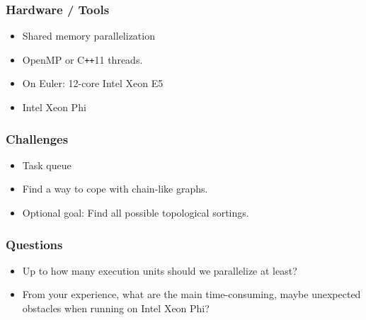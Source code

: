 \begin{frame}
\frametitle{Hardware / Tools}
\begin{itemize}
        \item Shared memory parallelization
        \item OpenMP or C\texttt{++}11 threads.
        \item On Euler: 12-core Intel Xeon E5
        \item Intel Xeon Phi
\end{itemize}
\end{frame}

\begin{frame}
\frametitle{Challenges}
\begin{itemize}
	\item Task queue
	\item Find a way to cope with chain-like graphs.
	\item Optional goal: Find all possible topological sortings.
\end{itemize}
\end{frame}


\begin{frame}
\frametitle{Questions}
\begin{itemize}
	\item Up to how many execution units should we parallelize at least?
	\item From your experience, what are the main time-consuming, maybe unexpected obstacles when running on Intel Xeon Phi?
\end{itemize}
\end{frame}


 
